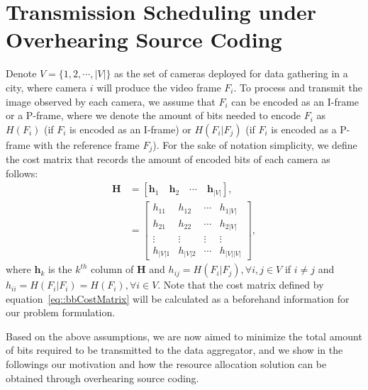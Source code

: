 \section{Transmission Scheduling under Overhearing Source Coding}
\label{sec::OSC}
Denote ${V=\{ 1,2,\cdots,|V| \}}$ as the set of cameras deployed for data gathering in a city, where camera $i$ will produce the video frame $F_i$.
To process and transmit the image observed by each camera, we assume that $F_i$ can be encoded as an I-frame or a P-frame, where we denote the amount of bits needed to encode $F_i$ as $H(F_i)$ (if $F_i$ is encoded as an I-frame) or $H(F_i|F_j)$ (if $F_i$ is encoded as a P-frame with the reference frame $F_j$).
For the sake of notation simplicity, we define the cost matrix that records the amount of encoded bits of each camera as follows:
\begin{align}
\mathbf{H}
&= \left[ \mathbf{h}_1 \quad \mathbf{h}_2 \quad \cdots \quad \mathbf{h}_{|V|} \right], \nonumber \\
&= \left[ \begin{array}{cccc}
h_{11} &h_{12} &\cdots &h_{1|V|} \\
h_{21} &h_{22} &\cdots &h_{2|V|} \\
\vdots &\vdots &\vdots &\vdots \\
h_{|V|1} &h_{|V|2} &\cdots &h_{|V||V|}
\end{array} \right],
\label{eq::bbCostMatrix}
\end{align}
where $\mathbf{h}_k$ is the $k^{th}$ column of $\mathbf{H}$ and ${h_{ij} = H(F_i|F_j)},{\forall i,j \in V}$ if ${i \neq j}$ and ${h_{ii}=H(F_i|F_i)=H(F_i)},{\forall i \in V}$.
Note that the cost matrix defined by equation~\eqref{eq::bbCostMatrix} will be calculated as a beforehand information for our problem formulation.

Based on the above assumptions, we are now aimed to minimize the total amount of bits required to be transmitted to the data aggregator, and we show in the followings our motivation and how the resource allocation solution can be obtained through overhearing source coding.
%
